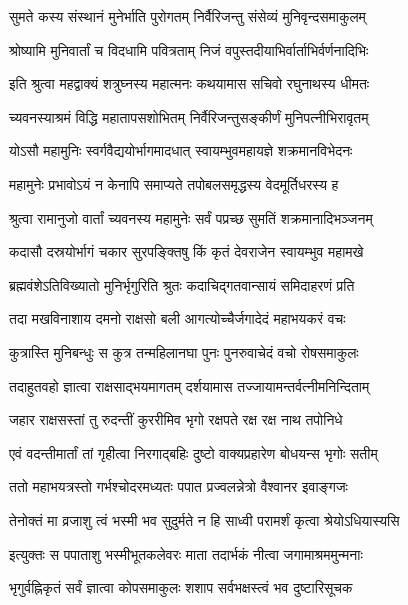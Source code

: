 \twolineshloka
{सुमते कस्य संस्थानं मुनेर्भाति पुरोगतम्}
{निर्वैरिजन्तु संसेव्यं मुनिवृन्दसमाकुलम्}%

\twolineshloka
{श्रोष्यामि मुनिवार्तां च विदधामि पवित्रताम्}
{निजं वपुस्तदीयाभिर्वार्ताभिर्वर्णनादिभिः}%

\twolineshloka
{इति श्रुत्वा महद्वाक्यं शत्रुघ्नस्य महात्मनः}
{कथयामास सचिवो रघुनाथस्य धीमतः}%


\twolineshloka
{च्यवनस्याश्रमं विद्धि महातापसशोभितम्}
{निर्वैरिजन्तुसङ्कीर्णं मुनिपत्नीभिरावृतम्}%

\twolineshloka
{योऽसौ महामुनिः स्वर्गवैद्ययोर्भागमादधात्}
{स्वायम्भुवमहायज्ञे शक्रमानविभेदनः}%

\twolineshloka
{महामुनेः प्रभावोऽयं न केनापि समाप्यते}
{तपोबलसमृद्धस्य वेदमूर्तिधरस्य ह}%

\twolineshloka
{श्रुत्वा रामानुजो वार्तां च्यवनस्य महामुनेः}
{सर्वं पप्रच्छ सुमतिं शक्रमानादिभञ्जनम्}%


\twolineshloka
{कदासौ दस्रयोर्भागं चकार सुरपङ्क्तिषु}
{किं कृतं देवराजेन स्वायम्भुव महामखे}%


\twolineshloka
{ब्रह्मवंशेऽतिविख्यातो मुनिर्भृगुरिति श्रुतः}
{कदाचिद्गतवान्सायं समिदाहरणं प्रति}%

\twolineshloka
{तदा मखविनाशाय दमनो राक्षसो बली}
{आगत्योच्चैर्जगादेदं महाभयकरं वचः}%

\twolineshloka
{कुत्रास्ति मुनिबन्धुः स कुत्र तन्महिलानघा}
{पुनः पुनरुवाचेदं वचो रोषसमाकुलः}%

\twolineshloka
{तदाहुतवहो ज्ञात्वा राक्षसाद्भयमागतम्}
{दर्शयामास तज्जायामन्तर्वत्नीमनिन्दिताम्}%

\twolineshloka
{जहार राक्षसस्तां तु रुदन्तीं कुररीमिव}
{भृगो रक्षपते रक्ष रक्ष नाथ तपोनिधे}%

\twolineshloka
{एवं वदन्तीमार्तां तां गृहीत्वा निरगाद्बहिः}
{दुष्टो वाक्यप्रहारेण बोधयन्स भृगोः सतीम्}%

\twolineshloka
{ततो महाभयत्रस्तो गर्भश्चोदरमध्यतः}
{पपात प्रज्वलन्नेत्रो वैश्वानर इवाङ्गजः}%

\twolineshloka
{तेनोक्तं मा व्रजाशु त्वं भस्मी भव सुदुर्मते}
{न हि साध्वी परामर्शं कृत्वा श्रेयोऽधियास्यसि}%

\twolineshloka
{इत्युक्तः स पपाताशु भस्मीभूतकलेवरः}
{माता तदार्भकं नीत्वा जगामाश्रममुन्मनाः}%

\twolineshloka
{भृगुर्वह्निकृतं सर्वं ज्ञात्वा कोपसमाकुलः}
{शशाप सर्वभक्षस्त्वं भव दुष्टारिसूचक}%

